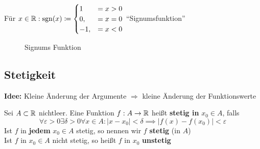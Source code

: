 \begin{subexample}
	Für $ x \in \mathbb{R} : \operatorname{sgn}(x) \coloneqq \begin{cases}
		1 &= x>0 \\
		0, &= x = 0 \\
		-1, &= x < 0 \\
	\end{cases} $ ``Signumsfunktion''
	\begin{figure}[H]
		\centering
		\caption{Signums Funktion}
		\label{Signums Funktion}
	\end{figure}
\end{subexample}

\subsection{Stetigkeit}
\textbf{Idee:} Kleine Änderung der Argumente $ \Rightarrow $ kleine Änderung der Funktionswerte
\begin{subdefinition}
	Sei $ A\subset \mathbb{R}  $ nichtleer. Eine Funktion $ f: A \to  \mathbb{R}  $ heißt \textbf{stetig in} $ x_0 \in  A $, falls \[
		\forall \varepsilon > 0 \exists \delta > 0 \forall x \in A : \left| x  - x_0 \right| < \delta \implies \left| f(x) - f(x_0) \right| < \varepsilon 
	\]
	Ist $ f $ in \textbf{jedem} $ x_0 \in A $ stetig, so nennen wir $ f $ \textbf{stetig} (in $ A $)\\
	Ist $ f $ in $ x_0 \in A $ nicht stetig, so heißt $ f $ in $ x_0 $ \textbf{unstetig}
\end{subdefinition}

